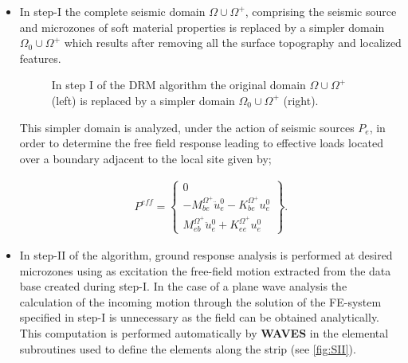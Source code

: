 \documentclass[12pt,letterpaper]{article}
\begin{document}
\begin{itemize}
\item In step-I the complete seismic domain $\Omega \cup \Omega^+$, comprising the seismic source and microzones of soft material properties is replaced by a simpler domain $\Omega_0 \cup \Omega^+$ which results after removing all the surface topography and localized features.

\begin{figure}[H]
\centering
{}
\caption{In step I of the DRM algorithm the original domain $\Omega \cup \Omega^+$ (left) is replaced by a simpler domain $\Omega_0 \cup \Omega^+$ (right).}
\label{fig:SI}
\end{figure}

This simpler domain is analyzed, under the action of seismic sources $P_e$, in order to determine the free field response leading to effective loads located over a boundary adjacent to the local site given by;

\begin{eqnarray}
{P^{eff}} = \left\{ {\begin{array}{*{20}{c}}
0\\
{ - M_{be}^{{\Omega ^ + }}\ddot u_e^0 - K_{be}^{{\Omega ^ + }}u_e^0}\\
{M_{eb}^{{\Omega ^ + }}\ddot u_e^0 + K_{ee}^{{\Omega ^ + }}u_e^0}
\end{array}} \right\}.
\label{effective}
\end{eqnarray}


\item In step-II of the algorithm, ground response analysis is performed at desired microzones using as excitation the free-field motion extracted from the data base created during step-I. In the case of a plane wave analysis the calculation of the incoming motion through the solution of the FE-system specified in step-I is unnecessary as the field can be obtained analytically. This computation is performed automatically by {\bf WAVES} in the elemental subroutines used to define the elements along the strip (see \cref{fig:SII}).


\end{itemize}
\end{document}
